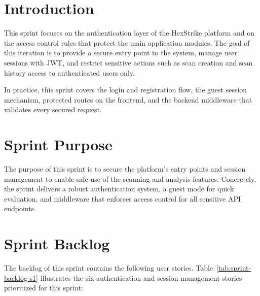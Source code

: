 ﻿\section{Introduction}

\indent\justifying This sprint focuses on the authentication layer of the HexStrike platform and on the access control rules that protect the main application modules. The goal of this iteration is to provide a secure entry point to the system, manage user sessions with JWT, and restrict sensitive actions such as scan creation and scan history access to authenticated users only.

\indent In practice, this sprint covers the login and registration flow, the guest session mechanism, protected routes on the frontend, and the backend middleware that validates every secured request.

\section{Sprint Purpose}

\indent\justifying The purpose of this sprint is to secure the platform's entry points and session management to enable safe use of the scanning and analysis features. Concretely, the sprint delivers a robust authentication system, a guest mode for quick evaluation, and middleware that enforces access control for all sensitive API endpoints.

\section{Sprint Backlog}

\indent The backlog of this sprint contains the following user stories. Table~\ref{tab:sprint-backlog-s1} illustrates the six authentication and session management stories prioritized for this sprint:


